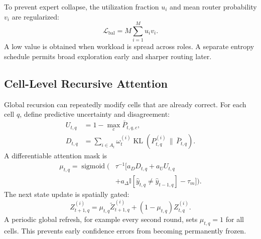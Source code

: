 \documentclass[10pt,a4paper,twocolumn]{article}
\newcommand{\KL}{\operatorname{KL}}
\newcommand{\sigmoid}{\operatorname{sigmoid}}
\newcommand{\Ind}{\mathbb{I}}
\begin{document}
To prevent expert collapse, the utilization fraction $u_i$ and mean router probability $v_i$ are regularized:
\begin{equation}
\mathcal{L}_{\mathrm{bal}}=M\sum_{i=1}^{M}u_iv_i. \label{eq:balance_loss}
\end{equation}
A low value is obtained when workload is spread across roles. A separate entropy schedule permits broad exploration early and sharper routing later.

\subsection{Cell-Level Recursive Attention}
Global recursion can repeatedly modify cells that are already correct. For each cell $q$, define predictive uncertainty and disagreement:
\begin{align}
U_{t,q} &= 1-\max_c\bar P_{t,q,c},\\
D_{t,q} &= \sum_{i\in A_t}\omega_t^{(i)}\KL\!\left(P_{t,q}^{(i)}\,\|\,\bar P_{t,q}\right). \label{eq:cell_scores}
\end{align}
A differentiable attention mask is
\begin{equation}
\begin{aligned}
\mu_{t,q}=\sigmoid\!\Big(&\tau^{-1}\big[a_DD_{t,q}+a_UU_{t,q}\\
&+a_\Delta\Ind[\hat y_{t,q}\neq\hat y_{t-1,q}]-\tau_m\big]\Big).
\end{aligned}
\label{eq:cell_mask}
\end{equation}
The next state update is spatially gated:
\begin{equation}
Z_{t+1,q}^{(i)}=\mu_{t,q}\widetilde Z_{t+1,q}^{(i)}+(1-\mu_{t,q})Z_{t,q}^{(i)}. \label{eq:cell_update}
\end{equation}
A periodic global refresh, for example every second round, sets $\mu_{t,q}=1$ for all cells. This prevents early confidence errors from becoming permanently frozen.
\end{document}
